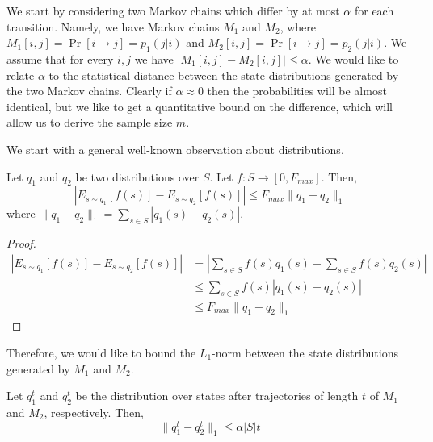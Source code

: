 We start by considering two Markov chains which differ by at most
$\alpha$ for each transition. Namely, we have Markov chains $M_1$
and $M_2$, where $M_1[i,j]=\Pr[i\rightarrow j]=p_1(j|i)$ and
$M_2[i,j]=\Pr[i\rightarrow j]=p_2(j|i)$. We assume that for every
$i,j$ we have $|M_1[i,j]-M_2[i,j]|\leq \alpha$. We would like to
relate $\alpha$ to the statistical distance between the state distributions
generated by the two Markov chains. Clearly if $\alpha\approx 0$
then the probabilities will be almost identical, but we like to get
a quantitative bound on the difference, which will allow us to
derive the sample size $m$.


We start with a general well-known observation about distributions.

\begin{theorem}
\label{thm:dist-l1}
Let $q_1$ and $q_2$ be two distributions over
$S$. Let $f:S\rightarrow [0,F_{max}]$. Then,
\[
|E_{s\sim q_1}[f(s)]- E_{s\sim q_2}[f(s)]|\leq F_{max} \|q_1-q_2\|_1
\]
where $\|q_1-q_2\|_1=\sum_{s\in S} |q_1(s)-q_2(s)|$.
\end{theorem}

\begin{proof}
\begin{align*} |E_{s\sim q_1}[f(s)]- E_{s\sim q_2}[f(s)]|
&=|\sum_{s\in S} f(s)q_1(s) - \sum_{s\in S} f(s)q_2(s)| \\
&\leq \sum_{s\in S} f(s)|q_1(s) - q_2(s)|\\
 &\leq F_{max} \|q_1-q_2\|_1
\end{align*}
\end{proof}

Therefore, we would like to bound the $L_1$-norm between the
state distributions generated by $M_1$ and $M_2$.


\begin{theorem}
\label{thm:l1-error}
Let $q_1^t$ and $q_2^t$ be the distribution
over states after trajectories  of length $t$ of $M_1$ and $M_2$, respectively.
Then,
\[
\|q_1^t-q_2^t\|_1\leq \alpha |S| t
\]
\end{theorem}

